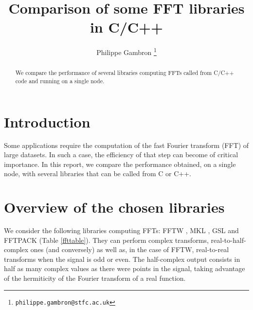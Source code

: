 \documentclass[12pt, a4paper]{article}
\date{}
\begin{document}
\title{Comparison of some FFT libraries in C/C++}
\author{Philippe Gambron \thanks{\texttt{philippe.gambron{@}stfc.ac.uk}}}
\maketitle
\begin{abstract}
We compare the performance of several libraries computing FFTs called from C/C++ code and running on a single node. 
\end{abstract}
\section{Introduction}
Some applications require the computation of the fast Fourier transform (FFT) of large datasets. In such a case, the efficiency of that step can become of critical importance. In this report, we compare the performance obtained, on a single node, with several libraries that can be called from C or C++.
\section{Overview of the chosen libraries}
We consider the following libraries computing FFTs: FFTW \cite{fftw}, MKL \cite{mkl}, GSL \cite{gsl} and FFTPACK \cite{fftpack} (Table \ref{ffttable}). They can perform complex transforms, real-to-half-complex ones (and conversely) as well as, in the case of FFTW, real-to-real transforms when the signal is odd or even. The half-complex output consists in half as many complex values as there were points in the signal, taking advantage of the hermiticity of the Fourier transform of a real function.\\
\end{document}
